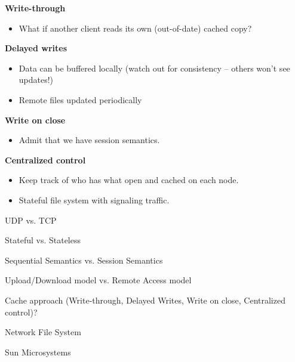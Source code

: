 \begin{slide}

	
	\textbf{Write-through}
	\begin{itemize}
		\item What if another client reads its own (out-of-date) cached copy?
	\end{itemize}
	\medskip
	
	\textbf{Delayed writes}
	\begin{itemize}
		\item Data can be buffered locally (watch out for consistency – others won’t see updates!)
		\item Remote files updated periodically
	\end{itemize}
	\medskip
	
	\textbf{Write on close}
	\begin{itemize}
		\item Admit that we have session semantics.
	\end{itemize}
	\medskip
	
	\textbf{Centralized control}
	\begin{itemize}
		\item Keep track of who has what open and cached on each node.
		\item Stateful file system with signaling traffic.
	\end{itemize}
	
\end{slide}

\begin{slide}

	
	UDP vs. TCP
	\medskip
	
	Stateful vs. Stateless
	\medskip
	
	Sequential Semantics vs. Session Semantics
	\medskip
	
	Upload/Download model vs. Remote Access model
	\medskip
	
	Cache approach (Write-through, Delayed Writes, Write on close, Centralized control)?
	
\end{slide}

\begin{slide}

	
	Network File System
	\bigskip
	
	Sun Microsystems

\end{slide}

